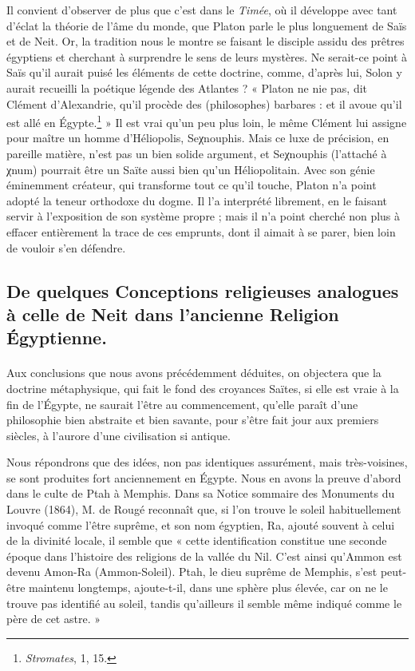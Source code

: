 \documentclass[a4paper, 11pt, oneside]{article}
\begin{document}
Il convient d'observer de plus que c'est dans le \emph{Timée}, où il développe avec tant d'éclat la théorie de l'âme du monde, que Platon parle le plus longuement de Saïs et de Neit. Or, la tradition nous le montre se faisant le disciple assidu des prêtres égyptiens et cherchant à surprendre le sens de leurs mystères. Ne serait-ce point à Saïs qu'il aurait puisé les éléments de cette doctrine, comme, d'après lui, Solon y aurait recueilli la poétique légende des Atlantes ? « Platon ne nie pas, dit Clément d'Alexandrie, qu'il procède des (philosophes) barbares : et il avoue qu'il est allé en Égypte.\footnote{\emph{Stromates}, 1, 15.} » Il est vrai qu'un peu plus loin, le même Clément lui assigne pour maître un homme d'Héliopolis, Seχnouphis. Mais ce luxe de précision, en pareille matière, n'est pas un bien solide argument, et Seχnouphis (l'attaché à χnum) pourrait être un Saïte aussi bien qu'un Héliopolitain. Avec son génie éminemment créateur, qui transforme tout ce qu'il touche, Platon n'a point adopté la teneur orthodoxe du dogme. Il l'a interprété librement, en le faisant servir à l'exposition de son système propre ; mais il n'a point cherché non plus à effacer entièrement la trace de ces emprunts, dont il aimait à se parer, bien loin de vouloir s'en défendre.
\clearpage
\subsection{De quelques Conceptions religieuses analogues à celle de Neit dans l'ancienne Religion Égyptienne.}
\paragraph{}
Aux conclusions que nous avons précédemment déduites, on objectera que la doctrine métaphysique, qui fait le fond des croyances Saïtes, si elle est vraie à la fin de l'Égypte, ne saurait l'être au commencement, qu'elle paraît d'une philosophie bien abstraite et bien savante, pour s'être fait jour aux premiers siècles, à l'aurore d'une civilisation si antique.

Nous répondrons que des idées, non pas identiques assurément, mais très-voisines, se sont produites fort anciennement en Égypte. Nous en avons la preuve d'abord dans le culte de Ptah à Memphis. Dans sa Notice sommaire des Monuments du Louvre (1864), M. de Rougé reconnaît que, si l'on trouve le soleil habituellement invoqué comme l'être suprême, et son nom égyptien, Ra, ajouté souvent à celui de la divinité locale, il semble que « cette identification constitue une seconde époque dans l'histoire des religions de la vallée du Nil. C'est ainsi qu'Ammon est devenu Amon-Ra (Ammon-Soleil). Ptah, le dieu suprême de Memphis, s'est peut-être maintenu longtemps, ajoute-t-il, dans une sphère plus élevée, car on ne le trouve pas identifié au soleil, tandis qu'ailleurs il semble même indiqué comme le père de cet astre. »
\end{document}
